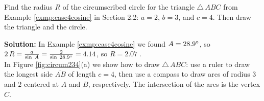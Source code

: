 \begin{exmp}
 Find the radius $R$ of the circumscribed circle for the triangle $\triangle\,ABC$ from Example
 \ref{exmp:case4cosine} in Section 2.2: $a = 2$, $b = 3$, and $c = 4$. Then draw the triangle and
 the circle.\vspace{1mm}
 \par\noindent\textbf{Solution:} In Example \ref{exmp:case4cosine} we found $A=28.9^\circ$, so
 $2\,R = \frac{a}{\sin\;A} = \frac{2}{\sin\;28.9^\circ} = 4.14$, so
 $\boxed{R = 2.07}\;$.\vspace{1mm}\\In Figure \ref{fig:circum234}(a) we show how to draw
 $\triangle\,ABC$: use a ruler to draw the longest side $\overline{AB}$ of length $c=4$, then use a
 compass to draw arcs of radius $3$ and $2$ centered at $A$ and $B$, respectively. The intersection
 of the arcs is the vertex $C$.\vspace{-2mm}


\end{exmp}
